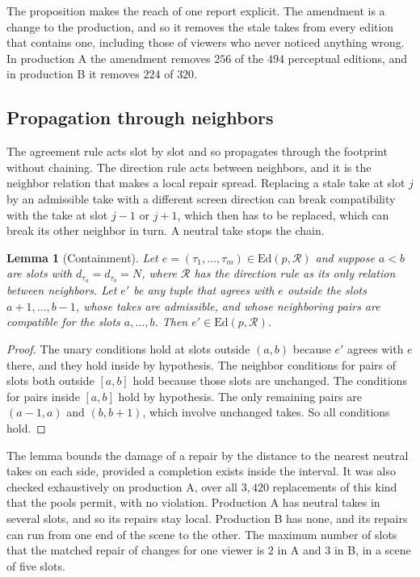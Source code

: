 \documentclass[11pt,twoside,openright]{book}
\theoremstyle{plain}
\newtheorem{lemma}[theorem]{Lemma}
\theoremstyle{definition}
\theoremstyle{remark}
\newcommand{\Ed}{\mathrm{Ed}}       %
\begin{document}
The proposition makes the reach of one report explicit. The amendment is a change to the production, and so it removes the stale takes from every edition that contains one, including those of viewers who never noticed anything wrong. In production A the amendment removes $256$ of the $494$ perceptual editions, and in production B it removes $224$ of $320$.

\subsection{Propagation through neighbors}

The agreement rule acts slot by slot and so propagates through the footprint without chaining. The direction rule acts between neighbors, and it is the neighbor relation that makes a local repair spread. Replacing a stale take at slot $j$ by an admissible take with a different screen direction can break compatibility with the take at slot $j-1$ or $j+1$, which then has to be replaced, which can break its other neighbor in turn. A neutral take stops the chain.

\begin{lemma}[Containment]\label{lem:contain}
Let $e=(\tau_1,\dots,\tau_m)\in\Ed(p,\mathcal R)$ and suppose $a<b$ are slots with $d_{\tau_a}=d_{\tau_b}=N$, where $\mathcal R$ has the direction rule as its only relation between neighbors. Let $e'$ be any tuple that agrees with $e$ outside the slots $a+1,\dots,b-1$, whose takes are admissible, and whose neighboring pairs are compatible for the slots $a,\dots,b$. Then $e'\in\Ed(p,\mathcal R)$.
\end{lemma}

\begin{proof}
The unary conditions hold at slots outside $(a,b)$ because $e'$ agrees with $e$ there, and they hold inside by hypothesis. The neighbor conditions for pairs of slots both outside $[a,b]$ hold because those slots are unchanged. The conditions for pairs inside $[a,b]$ hold by hypothesis. The only remaining pairs are $(a-1,a)$ and $(b,b+1)$, which involve unchanged takes. So all conditions hold.
\end{proof}

The lemma bounds the damage of a repair by the distance to the nearest neutral takes on each side, provided a completion exists inside the interval. It was also checked exhaustively on production A, over all $3{,}420$ replacements of this kind that the pools permit, with no violation. Production A has neutral takes in several slots, and so its repairs stay local. Production B has none, and its repairs can run from one end of the scene to the other. The maximum number of slots that the matched repair of  changes for one viewer is $2$ in A and $3$ in B, in a scene of five slots.
\end{document}
